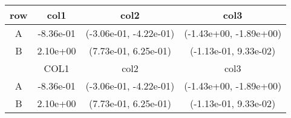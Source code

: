 \begin{tabular}{cccc}
\toprule
row&col1&col2&col3\tabularnewline
\midrule
A&-8.36e-01& (-3.06e-01, -4.22e-01)& (-1.43e+00, -1.89e+00)\tabularnewline
B&2.10e+00& (7.73e-01, 6.25e-01)& (-1.13e-01, 9.33e-02)\tabularnewline
\midrule
&COL1&col2&col3\tabularnewline
\midrule
A&-8.36e-01& (-3.06e-01, -4.22e-01)& (-1.43e+00, -1.89e+00)\tabularnewline
B&2.10e+00& (7.73e-01, 6.25e-01)& (-1.13e-01, 9.33e-02)\tabularnewline
\bottomrule
\end{tabular}
